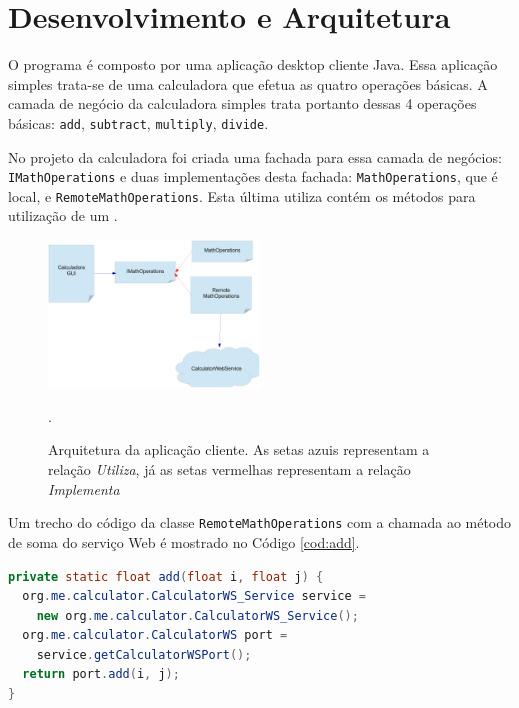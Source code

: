 %

\chapter{Desenvolvimento e Arquitetura}

O programa é composto por uma aplicação desktop cliente Java. Essa aplicação
simples trata-se de uma calculadora que efetua as quatro operações básicas.
A camada de negócio da calculadora simples trata portanto dessas 4 operações básicas:
\texttt{add}, \texttt{subtract}, \texttt{multiply}, \texttt{divide}.

No projeto da calculadora foi criada uma fachada para essa camada de negócios:
\texttt{IMathOperations} e duas implementações desta fachada:
\texttt{MathOperations}, que é local, e \texttt{RemoteMathOperations}. Esta
última utiliza contém os métodos para utilização de um \WebService.


\begin{figure}[htb]
  \centering
  \includegraphics[width=0.5\textwidth]{imgs/calculadora}
  \caption{Arquitetura da aplicação cliente. As setas azuis representam a
    relação \textit{Utiliza}, já as setas vermelhas representam a relação
  \textit{Implementa}}.
  \label{fig:arquitetura:calc}
\end{figure}

Um trecho do código da classe \texttt{RemoteMathOperations} com a chamada ao
método de soma do serviço Web é mostrado no Código \ref{cod:add}.

\begin{lstlisting}[float,caption=Operação de chamada ao WebService,label=cod:add,language=Java]
private static float add(float i, float j) {
  org.me.calculator.CalculatorWS_Service service = 
    new org.me.calculator.CalculatorWS_Service();
  org.me.calculator.CalculatorWS port = 
    service.getCalculatorWSPort();
  return port.add(i, j);
}
\end{lstlisting}

